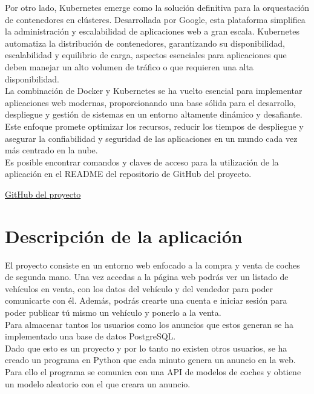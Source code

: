 \documentclass{report}
\begin{document}
        Por otro lado, Kubernetes emerge como la solución definitiva para la orquestación de contenedores en clústeres. Desarrollada por Google, esta plataforma simplifica la administración y escalabilidad de aplicaciones web a gran escala. Kubernetes automatiza la distribución de contenedores, garantizando su disponibilidad, escalabilidad y equilibrio de carga, aspectos esenciales para aplicaciones que deben manejar un alto volumen de tráfico o que requieren una alta disponibilidad.\\
        
        La combinación de Docker y Kubernetes se ha vuelto esencial para implementar aplicaciones web modernas, proporcionando una base sólida para el desarrollo, despliegue y gestión de sistemas en un entorno altamente dinámico y desafiante. Este enfoque promete optimizar los recursos, reducir los tiempos de despliegue y asegurar la confiabilidad y seguridad de las aplicaciones en un mundo cada vez más centrado en la nube.\\
        
        Es posible encontrar comandos y claves de acceso para la utilización de la aplicación en el README del repositorio de GitHub del proyecto.\\
        \vfill
        \begin{center}
            \textcolor{Cyan}{\href{https://github.com/Xabierland/AS-Proyecto}{GitHub del proyecto}}
        \end{center}
    \chapter{Descripción de la aplicación}
        El proyecto consiste en un entorno web enfocado a la compra y venta de coches de segunda mano.
        Una vez accedas a la página web podrás ver un listado de vehículos en venta, con los datos del vehículo y del vendedor para poder comunicarte con él.
        Además, podrás crearte una cuenta e iniciar sesión para poder publicar tú mismo un vehículo y ponerlo a la venta.\\

        Para almacenar tantos los usuarios como los anuncios que estos generan se ha implementado una base de datos PostgreSQL.\\

        Dado que esto es un proyecto y por lo tanto no existen otros usuarios, se ha creado un programa en Python que cada minuto genera un anuncio en la web.
        Para ello el programa se comunica con una API de modelos de coches y obtiene un modelo aleatorio con el que creara un anuncio.\\
\end{document}
